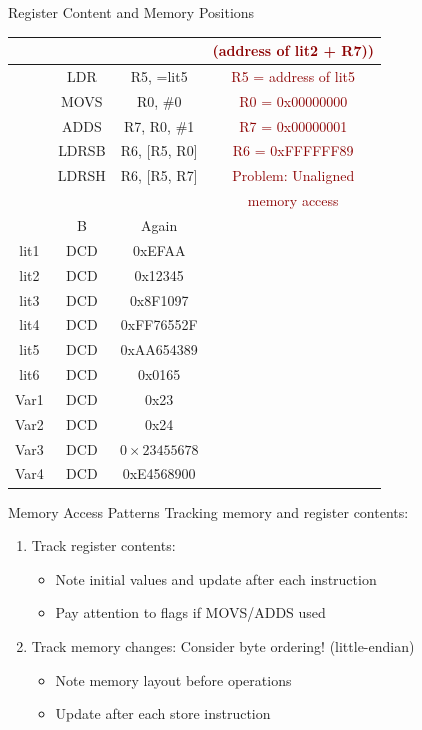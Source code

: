 \begin{example2}{Register Content and Memory Positions}
\begin{center}
\begin{tabular}{|c|c|c|c|}
 & & & \textcolor{darkred}{(address of lit2 + R7))} \\
\hline
 & LDR & R5, =lit5 & \textcolor{darkred}{R5 = address of lit5} \\
\hline
 & MOVS & R0, \#0 & \textcolor{darkred}{R0 = 0x00000000} \\
\hline
 & ADDS & R7, R0, \#1 & \textcolor{darkred}{R7 = 0x00000001} \\
\hline
 & LDRSB & R6, [R5, R0] & \textcolor{darkred}{R6 = 0xFFFFFF89} \\
\hline
 & LDRSH & R6, [R5, R7] & \textcolor{darkred}{Problem: Unaligned}  \\
 & & & \textcolor{darkred}{memory access} \\
\hline
 & B & Again &  \\
\hline
lit1 & DCD & 0xEFAA &  \\
\hline
lit2 & DCD & 0x12345 &  \\
\hline
lit3 & DCD & 0x8F1097 &  \\
\hline
lit4 & DCD & 0xFF76552F &  \\
\hline
lit5 & DCD & 0xAA654389 &  \\
\hline
lit6 & DCD & 0x0165 &  \\
\hline
Var1 & DCD & 0x23 &  \\
\hline
Var2 & DCD & 0x24 &  \\
\hline
Var3 & DCD & $0 \times 23455678$ &  \\
\hline
Var4 & DCD & 0xE4568900 &  \\
\hline
\end{tabular}
\end{center}
\end{example2}

\begin{KR}{Memory Access Patterns}
Tracking memory and register contents:
\begin{enumerate}
  \item Track register contents:
    \begin{itemize}
      \item Note initial values and update after each instruction
      \item Pay attention to flags if MOVS/ADDS used
    \end{itemize}
  \item Track memory changes: Consider byte ordering! (little-endian)
    \begin{itemize}
      \item Note memory layout before operations
      \item Update after each store instruction
    \end{itemize}
\end{enumerate}
\end{KR}

